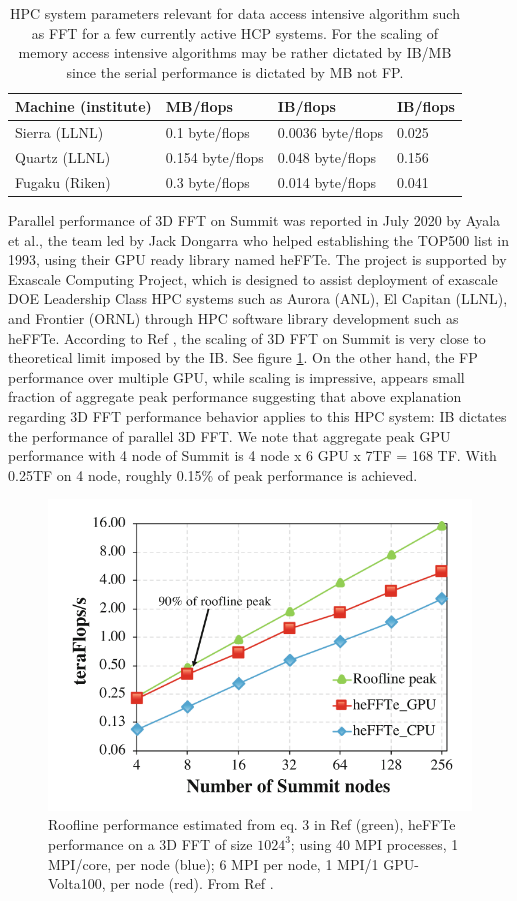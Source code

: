 \begin{table}[ht]
    \centering
    \begin{tabular}{|l|lll|}
    \hline
        Machine (institute) &  MB/flops & IB/flops & IB/flops \\
        \hline
        Sierra (LLNL) &  0.1 byte/flops & 0.0036 byte/flops & 0.025 \\
        Quartz (LLNL) & 0.154 byte/flops & 0.048 byte/flops & 0.156\\
        Fugaku (Riken) &  0.3 byte/flops & 0.014 byte/flops  & 0.041 \\
        \hline
    \end{tabular}
    \caption{HPC system parameters relevant for data access intensive algorithm such as FFT for a few currently active HCP systems. For the scaling of memory access intensive algorithms may be rather dictated by IB/MB since the serial performance is dictated by MB not FP.}
    \label{tab:hpc_performance}
\end{table}

Parallel performance of 3D FFT on Summit was reported in July 2020 by Ayala et al., the team led by Jack Dongarra who helped establishing the TOP500 list in 1993,\cite{dongarra500} using their GPU ready library named heFFTe.\cite{heFFTe2020} The project is supported by Exascale Computing Project, which is designed to assist deployment of exascale DOE Leadership Class HPC systems such as Aurora (ANL), El Capitan (LLNL), and Frontier (ORNL) through HPC software library development such as heFFTe. According to Ref \cite{heFFTe2020}, the scaling of 3D FFT on Summit is very close to theoretical limit imposed by the IB. See figure \ref{fig:heFFTe}. On the other hand, the FP performance over multiple GPU, while scaling is impressive, appears small fraction of aggregate peak performance suggesting that above explanation regarding 3D FFT performance behavior applies to this HPC system: IB dictates the performance of parallel 3D FFT. We note that aggregate peak GPU performance with 4 node of Summit is 4 node x 6 GPU x 7TF = 168 TF. With 0.25TF on 4 node, roughly 0.15\% of peak performance is achieved.

\begin{figure}[ht]
    \centering\includegraphics[width=0.5\linewidth]{figures/heFFTe.png}
    \caption{Roofline performance estimated from eq. 3 in Ref \cite{heFFTe2020} (green), heFFTe performance on a 3D FFT of size $1024^3$; using 40 MPI processes, 1 MPI/core, per node (blue); 6 MPI per node, 1 MPI/1 GPU-Volta100, per node (red). From Ref \cite{heFFTe2020}.}
    \label{fig:heFFTe}
\end{figure}



